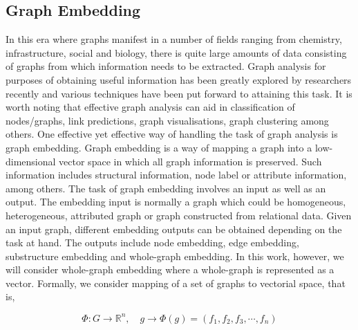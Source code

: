 \documentclass[10pt,a4paper]{article}
\theoremstyle{plain}
\theoremstyle{definition}
\begin{document}
     \subsection{Graph Embedding}
     In this era where graphs manifest in a number of fields ranging from chemistry, infrastructure, social and biology,  there is quite large amounts of data consisting of graphs from which information needs to be extracted. Graph analysis for purposes of obtaining useful information has been greatly explored by researchers recently and various techniques have been put forward to attaining this task. It is worth noting that effective graph analysis can aid in classification of nodes/graphs, link predictions, graph visualisations, graph clustering among others.
     One effective yet effective way of handling the task of graph analysis is graph embedding. Graph embedding is a way of mapping a graph into a low-dimensional vector space in which all graph information is preserved. Such information includes structural information, node label or attribute information, among others. 
     The task of graph embedding involves an input as well as an output. The embedding input is normally a graph which could be homogeneous, heterogeneous, attributed graph or graph constructed from relational data. Given an input graph, different embedding outputs can be obtained depending on the task at hand. The outputs include node embedding, edge embedding, substructure embedding and whole-graph embedding. In this work, however, we will consider whole-graph embedding where a whole-graph is represented as a vector.  Formally, we consider mapping of a set of graphs to vectorial space, that is,
     
     \begin{equation}
     \Phi : G \longrightarrow \mathbb{R}^n, \quad 
     g \longrightarrow \Phi(g) = (f_1, f_2, f_3, \cdots, f_n)
     \end{equation}     
     
\end{document}
